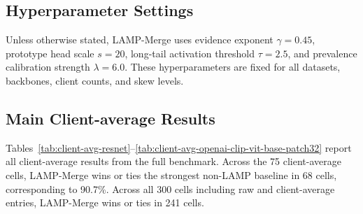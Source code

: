 \subsection{Hyperparameter Settings}

Unless otherwise stated, LAMP-Merge uses evidence exponent $\gamma=0.45$, prototype head scale $s=20$, long-tail activation threshold $\tau=2.5$, and prevalence calibration strength $\lambda=6.0$. These hyperparameters are fixed for all datasets, backbones, client counts, and skew levels.

\subsection{Main Client-average Results}

Tables~\ref{tab:client-avg-resnet}--\ref{tab:client-avg-openai-clip-vit-base-patch32} report all client-average results from the full benchmark. Across the 75 client-average cells, LAMP-Merge wins or ties the strongest non-LAMP baseline in 68 cells, corresponding to 90.7\%. Across all 300 cells including raw and client-average entries, LAMP-Merge wins or ties in 241 cells.

